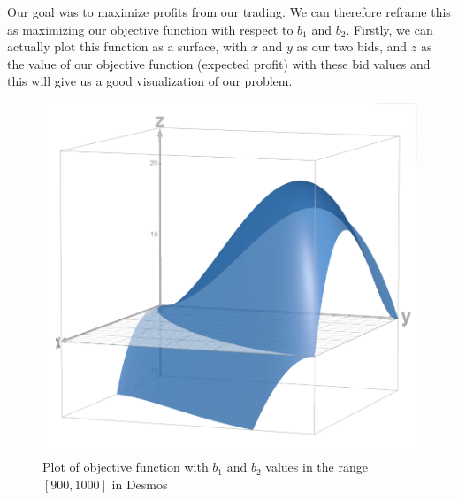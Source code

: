 \documentclass{article}
\begin{document}
Our goal was to maximize profits from our trading. We can therefore reframe this as maximizing our
objective function with respect to $b_1$ and $b_2$. Firstly, we can actually plot this function as a surface,
with $x$ and $y$ as our two bids, and $z$ as the value of our objective function (expected profit) with these
bid values and this will give us a good visualization of our problem.

\begin{figure}[h!]
    \centering
    \includegraphics[scale = 0.4]{O(b_1, b_2) plot.png}
    \caption{Plot of objective function with $b_1$ and $b_2$ values in the range $[900,1000]$ in Desmos}
\end{figure}
\end{document}
